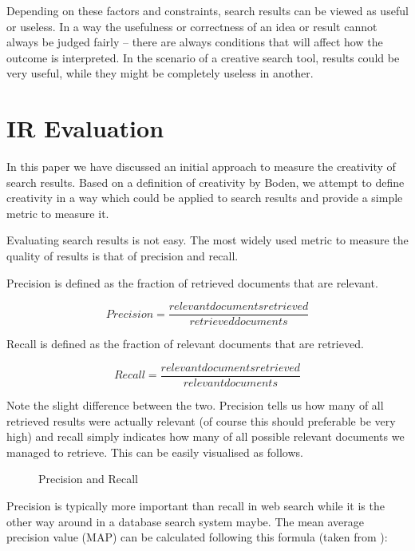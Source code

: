 Depending on these factors and constraints, search results can be viewed as useful or useless. In a way the usefulness or correctness of an idea or result cannot always be judged fairly – there are always conditions that will affect how the outcome is interpreted. In the scenario of a creative search tool, results could be very useful, while they might be completely useless in another.


\section{IR Evaluation}

In this paper \parencite{Sawle2011} we have discussed an initial approach to measure the creativity of search results. Based on a definition of creativity by Boden, we attempt to define creativity in a way which could be applied to search results and provide a simple metric to measure it.

Evaluating search results is not easy. The most widely used metric to measure the quality of results is that of precision and recall.

Precision is defined as the fraction of retrieved documents that are relevant.

\begin{equation}
  Precision = \frac{relevant documents retrieved}{retrieved documents}
  \label{eq:precision}
\end{equation}

Recall is defined as the fraction of relevant documents that are retrieved.

\begin{equation}
  Recall = \frac{relevant documents retrieved}{relevant documents}
  \label{eq:recall}
\end{equation}

Note the slight difference between the two. Precision tells us how many of all retrieved results were actually relevant (of course this should preferable be very high) and recall simply indicates how many of all possible relevant documents we managed to retrieve. This can be easily visualised as follows.

\begin{figure}[htbp]
  \centering
  
  \caption[Precision and Recall]{Precision and Recall}
\label{fig:PR}
\end{figure}

Precision is typically more important than recall in web search while it is the other way around in a database search system maybe. The mean average precision value (MAP) can be calculated following this formula (taken from \cite[p.141]{Baeza-Yates2011}):

